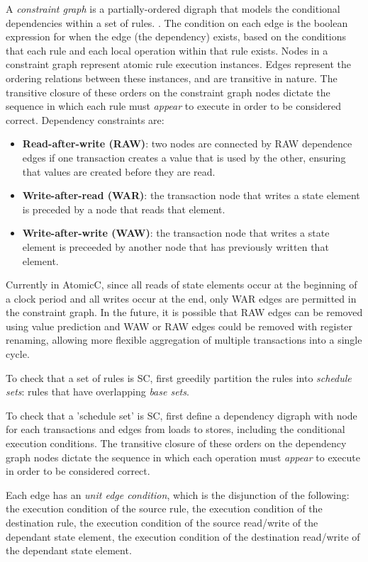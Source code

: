 A \textit{constraint graph} is a partially-ordered digraph that models
the conditional dependencies within a set of rules.
\cite[Sec.~3]{Cain2003}.
The condition on each edge is the boolean expression for when the
edge (the dependency) exists, based on the conditions that each rule
and each local operation within that rule exists.
Nodes in a constraint graph represent atomic rule execution instances.  Edges
represent the ordering relations between these instances, and are transitive in nature.
The transitive closure of these orders on the constraint graph nodes
dictate the sequence in which each rule must \textit{appear} to execute in
order to be considered correct.
Dependency constraints are:
\begin{itemize}
\item \textbf{Read-after-write (RAW)}: two nodes are connected by RAW dependence
edges if one transaction creates a value that is used by the other, ensuring
that values are created before they are read.
\item \textbf{Write-after-read (WAR)}: the transaction node that writes a state
element is preceded by a node that reads that element.
\item \textbf{Write-after-write (WAW)}: the transaction node that writes a state
element is preceeded by another node that has previously written that element.
\end{itemize}
Currently in AtomicC,
since all reads of state elements occur at the beginning of a clock period
and all writes occur at the end,
only WAR edges are permitted in the constraint graph.
In the future, it is possible that RAW edges can be removed using value prediction
and WAW or RAW edges could be removed with register renaming, allowing more
flexible aggregation of multiple transactions into a single cycle.

To check that a set of rules is SC, 
first greedily partition the rules into \textit{schedule sets}: rules that have
overlapping \textit{base sets}.

To check that a 'schedule set' is SC, first
define a dependency digraph with node for each transactions and
edges from loads to stores, including the conditional execution conditions.
The transitive closure of these orders on the dependency graph nodes dictate
the sequence in which each operation must \textit{appear} to execute in order to
be considered correct.
\cite[Sec.~11.1]{OV11}

Each edge has an \textit{unit edge condition}, which is the disjunction of the following:
the execution condition of the source rule,
the execution condition of the destination rule,
the execution condition of the source read/write of the dependant state element,
the execution condition of the destination read/write of the dependant state element.

